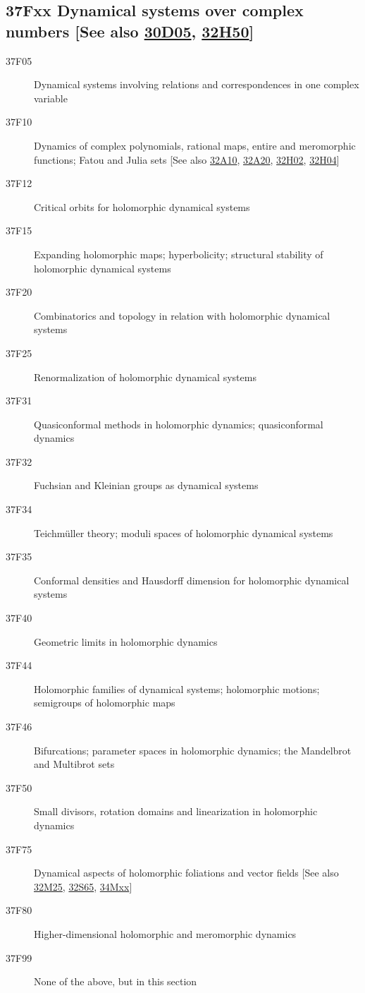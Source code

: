 \documentclass[letterpaper]{article}
\begin{document}
\subsection*{37Fxx  Dynamical systems over complex numbers [See also \hyperref[30D05]{30D05}, \hyperref[32H50]{32H50}] }\label{37Fxx}
\begin{description} 
\item [37F05]\label{37F05} Dynamical systems involving relations and correspondences in one complex variable 
\item [37F10]\label{37F10}  Dynamics of complex polynomials, rational maps, entire and meromorphic functions; Fatou and Julia sets [See also \hyperref[32A10]{32A10}, \hyperref[32A20]{32A20}, \hyperref[32H02]{32H02}, \hyperref[32H04]{32H04}]
\item [37F12]\label{37F12} Critical orbits for holomorphic dynamical systems
\item [37F15]\label{37F15} Expanding holomorphic maps; hyperbolicity;  structural stability of holomorphic dynamical systems
\item [37F20]\label{37F20} Combinatorics and topology in relation with holomorphic dynamical systems
\item [37F25]\label{37F25} Renormalization of holomorphic dynamical systems
\item [37F31]\label{37F31} Quasiconformal methods in holomorphic dynamics; quasiconformal dynamics
\item [37F32]\label{37F32} Fuchsian and Kleinian groups as dynamical systems 
\item [37F34]\label{37F34} Teichm\"{u}ller theory; moduli spaces of holomorphic dynamical systems
\item [37F35]\label{37F35} Conformal densities and Hausdorff dimension for holomorphic dynamical systems
\item [37F40]\label{37F40} Geometric limits in holomorphic dynamics
\item [37F44]\label{37F44} Holomorphic families of dynamical systems; holomorphic motions; semigroups of holomorphic maps
\item [37F46]\label{37F46} Bifurcations; parameter spaces in holomorphic dynamics; the Mandelbrot and Multibrot sets 
\item [37F50]\label{37F50} Small divisors, rotation domains and linearization in holomorphic dynamics  
\item [37F75]\label{37F75} Dynamical aspects of holomorphic foliations and vector fields  [See also \hyperref[32M25]{32M25}, \hyperref[32S65]{32S65}, \hyperref[34Mxx]{34Mxx}]
\item [37F80]\label{37F80} Higher-dimensional holomorphic and meromorphic dynamics
\item [37F99]\label{37F99} None of the above, but in this section
\end{description}
\end{document}
